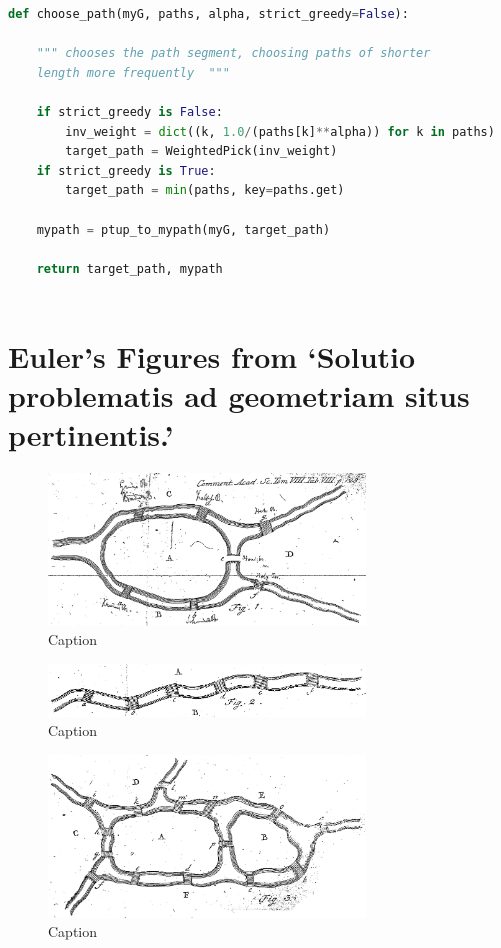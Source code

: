 \documentclass[10pt]{article}
\begin{document}
\begin{lstlisting}[language=Python]
def choose_path(myG, paths, alpha, strict_greedy=False):

    """ chooses the path segment, choosing paths of shorter
    length more frequently  """

    if strict_greedy is False:
        inv_weight = dict((k, 1.0/(paths[k]**alpha)) for k in paths)
        target_path = WeightedPick(inv_weight)
    if strict_greedy is True:
        target_path = min(paths, key=paths.get)

    mypath = ptup_to_mypath(myG, target_path)

    return target_path, mypath
    
\end{lstlisting}

\newpage
\section{Euler's Figures from ‘Solutio problematis ad geometriam situs pertinentis.’}
\begin{figure}[H]
    \centering
    \includegraphics[width=0.75\textwidth]{images/Solutio_problematis_ad_geometriam_situs_pertinentis_Fig_1.png} 
    \caption{Caption}
    \label{fig:my_label}
\end{figure}

\begin{figure}[H]
    \centering
    \includegraphics[width=0.75\textwidth]{images/Solutio_problematis_ad_geometriam_situs_pertinentis_Fig_2.png} 
    \caption{Caption}
    \label{fig:my_label}
\end{figure}

 
\begin{figure}[H]
    \centering
    \includegraphics[width=0.75\textwidth]{images/Solutio_problematis_ad_geometriam_situs_pertinentis_Fig_3.png} 
    \caption{Caption}
    \label{fig:my_label}
\end{figure}
\end{document}
